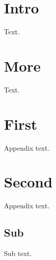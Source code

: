 \documentclass{article}
\begin{document}
\section{Intro}
Text.

\section{More}
Text.

\appendix

\section{First}
Appendix text.

\section{Second}
Appendix text.
\subsection{Sub}
Sub text.
\end{document}

